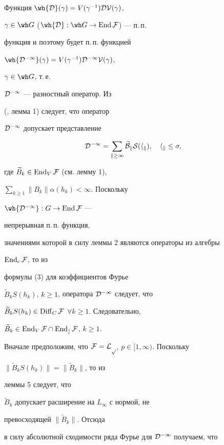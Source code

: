 \begin{pf} Функция $\wh{\cal D}(\gamma)=V(\gamma^{-1})\cal DV(\gamma)$, 


$\gamma\in\wh G$ ($\wh{\cal D}:\wh G\to\End\cal F$) --- п.\,п.


функция и поэтому будет п.\,п. функцией 


$\wh{\cal D^{-1}}(\gamma)=V(\gamma^{-1})\cal D^{-1}V(\gamma)$, 


$\gamma\in\wh G$, т.\,е. 


$\cal D^{-1}$ --- разностный оператор. Из


(\cite{Bask1}, лемма 1) следует, что оператор 


$\cal D^{-1}$ допускает представление


\begin{equation} 


\cal D^{-1}=\sum_{k\ge 1}\widetilde B_kS(h_k),\quad h_k\le\sigma, 


\end{equation} 


где $\widetilde B_k\in\operatorname{End}_V\cal F$ (см. лемму 1), 


$\sum\limits_{k\ge 1}\|B_k\|\alpha(h_k)<\infty$. Поскольку 


$\wh{\cal D^{-1}}:G\to\End\cal F$ --- 


непрерывная п.\,п. функция, 


значениями которой в силу леммы 2 являются операторы из алгебры 


$\operatorname{End}_c\cal F$, то из 


формулы (3) для коэффициентов Фурье 


$\widetilde B_kS(h_k)$, $k\ge 1$, оператора $\cal D^{-1}$ следует, что 


$\widetilde B_kS(h_k)\in\operatorname{Diff}_C\cal F$ $\forall k\ge 1$. Следовательно, 


$\widetilde B_k\in\operatorname{End}_V\cal F\cap\operatorname{End}_c\cal F$, $k\ge 1$. 


 


Вначале предположим, что $\cal F=L_p$, $p\in[1,\infty)$. Поскольку 


$\|\widetilde B_kS(h_k)\|=\|\widetilde B_k\|$, то из 


леммы 5 следует, что 


$\widetilde B_k$ допускает расширение на $L_\infty$ с нормой, не 


превосходящей $\|\widetilde B_k\|$. Отсюда 


в силу абсолютной сходимости ряда Фурье для $\cal D^{-1}$ получаем, что 



\end{pf}
